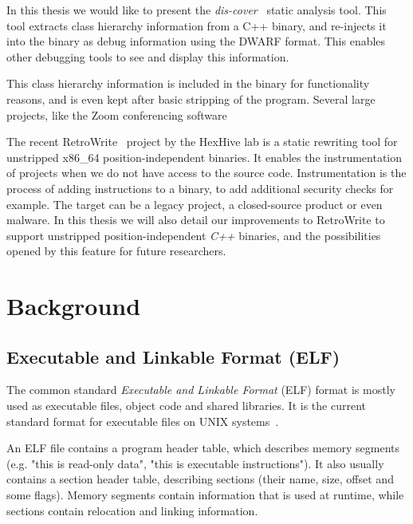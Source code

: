 \documentclass[a4paper,11pt,oneside]{report}
\newcommand{\dam}[1]{\todo[inline,color=red!40]{Damian: #1}}
\begin{document}
In this thesis we would like to present the 
\emph{dis-cover}~\cite{discovergithub} static analysis tool.
This tool extracts class hierarchy information from a C++ binary, and
re-injects it into the binary as debug information using the DWARF format.
This enables other debugging tools to see and display this information.

This class hierarchy information is included in the binary for functionality
reasons, and is even kept after basic stripping of the program.
Several large projects, like the Zoom conferencing software \dam{Something 
seems to be missing here.}

The recent RetroWrite~\cite{dinesh20oakland} project by the HexHive lab is a 
static rewriting tool for unstripped x86\_64 position-independent binaries.
It enables the instrumentation of projects when we do not have access to the 
source code.
Instrumentation is the process of adding instructions to a binary, to add
additional security checks for example.
The target can be a legacy project, a closed-source product or even malware.
In this thesis we will also detail our improvements to RetroWrite to support
unstripped position-independent \emph{C++} binaries, and the possibilities
opened by this feature for future researchers.

\chapter{Background}




\section{Executable and Linkable Format (ELF)}

The common standard \emph{Executable and Linkable Format} (ELF) format is 
mostly used as executable files, object code and shared libraries.
It is the current standard format for executable files on UNIX
systems~\cite{elfstandard}.

An ELF file contains a program header table, which describes memory segments 
(e.g. "this is read-only data", "this is executable instructions").
It also usually contains a section header table, describing sections (their 
name, size, offset and some flags).
Memory segments contain information that is used at runtime, while sections
contain relocation and linking information.
\end{document}
